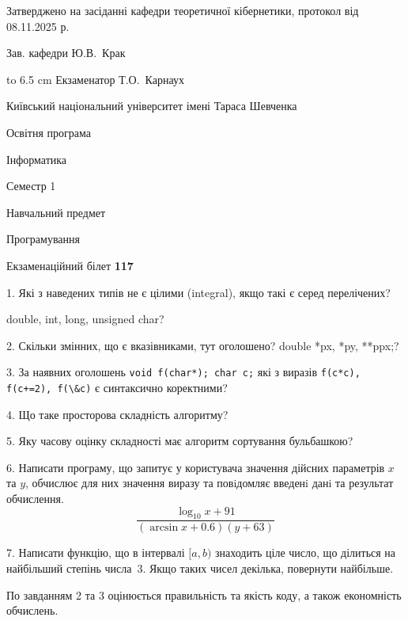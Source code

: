 \documentclass[12pt, ukrainian]{article}
\def\code#1{\Verb!#1!}
\begin{document}
{\smallskip\smallskip \begin {scriptsize} Затверджено на засіданні кафедри теоретичної кібернетики, протокол   від   08.11.2025 р.\par\smallskip\smallskip\smallskip\smallskip
{\parbox {6.5 cm} {Зав. кафедри \dotfill Ю.В.~Крак}}\hspace {0.7cm} {\hbox to 6.5 cm { Екзаменатор \dotfill Т.О.~Карнаух}} \end{scriptsize}}
\newpage
{{\begin {scriptsize}\par
{ \center  Київський національний університет імені Тараса Шевченка \par}
{\parbox {5 cm}{Освітня програма \hfill}{\parbox {7 cm}{Інформатика\hfill}}\parbox {6 cm}{\hfill Семестр 1}}\par
{\parbox {5 cm} {Навчальний предмет \hfill}\parbox {7 cm}{Програмування \hfill}\parbox {6cm}{\hfill}\par}\vspace{-15pt} \end{scriptsize}}{\center Екзаменаційний білет \No \textbf { 117 }\par}}
{%
1. Які з наведених типів не є цілими (integral), якщо такі є серед перелічених?

double, int, long, unsigned char?
\par
\vspace{2mm}
2. Скільки змінних, що є вказівниками, тут оголошено?
double *px, *py, **ppx;?
\par
\vspace{2mm}
3. За наявних оголошень \code{void f(char*); char c;} які з виразів \code{f(c*c), f(c+=2), f(\&c)} є синтаксично коректними?
\par
\vspace{2mm}
4. Що таке просторова складність алгоритму?
\par
\vspace{2mm}
5. Яку часову оцінку складності має алгоритм сортування бульбашкою?
\par
\vspace{2mm}
6. Написати програму, що запитує у користувача значення дійсних параметрів $x$ та $y$, обчислює для них значення виразу та повiдомляє введенi данi та результат обчислення.
$$\frac{\log_{10} x + 91}{(\arcsin x + 0.6) (y + 63)}$$ 

\par
7. Написати функцію, що в інтервалі $[a, b)$ знаходить ціле число, що ділиться на найбільший степінь числа 3. Якщо таких чисел декілька, повернути найбільше.

По завданням 2 та 3 оцінюється правильність та якість коду, а також економність обчислень.

}
\end{document}
